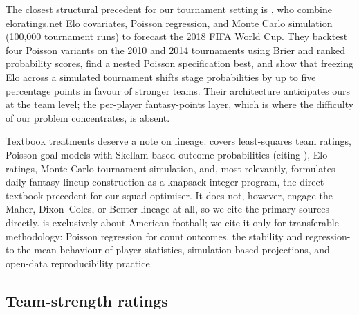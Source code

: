 The closest structural precedent for our tournament setting is
\citet{gilch2018elo}, who combine eloratings.net Elo covariates,
Poisson regression, and Monte Carlo simulation (100{,}000 tournament
runs) to forecast the 2018 FIFA World Cup. They backtest four Poisson
variants on the 2010 and 2014 tournaments using Brier and ranked
probability scores, find a nested Poisson specification best, and
show that freezing Elo across a simulated tournament shifts stage
probabilities by up to five percentage points in favour of stronger
teams. Their architecture anticipates ours at the team level; the
per-player fantasy-points layer, which is where the difficulty of our
problem concentrates, is absent.

Textbook treatments deserve a note on lineage.
\citet{winston2022mathletics} covers least-squares team ratings,
Poisson goal models with Skellam-based outcome probabilities (citing
\citealp{karlis2003analysis}), Elo ratings, Monte Carlo tournament
simulation, and, most relevantly, formulates daily-fantasy lineup
construction as a knapsack integer program, the direct textbook
precedent for our squad optimiser. It does not, however, engage the
Maher, Dixon--Coles, or Benter lineage at all, so we cite the primary
sources directly. \citet{eager2023football} is exclusively about
American football; we cite it only for transferable methodology:
Poisson regression for count outcomes, the stability and
regression-to-the-mean behaviour of player statistics,
simulation-based projections, and open-data reproducibility practice.

\subsection{Team-strength ratings}
\label{sec:related-ratings}

